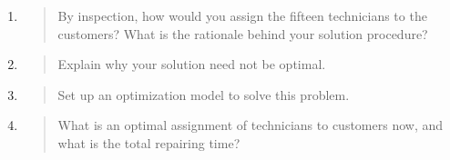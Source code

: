 \begin{enumerate}[(a)]
\begin{enumerate}[1.]
\item\begin{quote}By inspection, how would you assign the fifteen technicians to the customers?
What is the rationale behind your solution procedure?\end{quote}
\item\begin{quote}Explain why your solution need not be optimal.\end{quote}
\item\begin{quote}Set up an optimization model to solve this problem.\end{quote}
\item\begin{quote}What is an optimal assignment of technicians to customers now, and what is
the total repairing time?\end{quote}
\end{enumerate}

\end{enumerate}